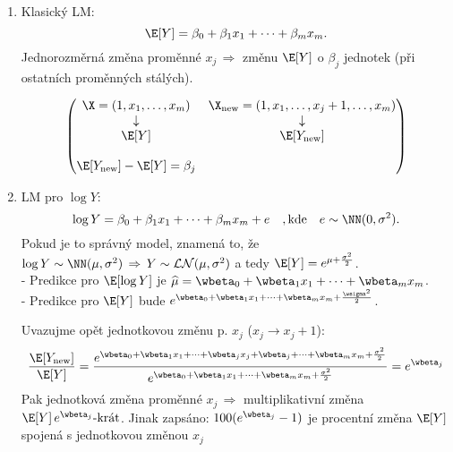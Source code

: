 \begin{enumerate}
\item Klasický LM: 
$$
 \E [ Y ] = \beta_0 + \beta_1 x_1 + \dots + \beta_m x_m.
$$
Jednorozměrná změna proměnné $ x_j \, \Rightarrow $ změnu $ \E [ Y ] $ o $ \beta_j $ jednotek (při ostatních proměnných stálých).

$$
\left( \begin{matrix}
\X = (1,x_1,\dots,x_m) & \X_{\text{new}} = (1,x_1,\dots,x_j+1,\dots,x_m) \\
\downarrow &  \downarrow \\
\E [ Y ] & \E [ Y_{\text{new}} ] \\
 & \\
 \E [ Y_{\text{new}} ] - \E [ Y ]  = \beta_j &
\end{matrix} \right)
$$
\item LM pro $\log Y$:
$$
 \log Y = \beta_0 + \beta_1 x_1 + \dots + \beta_m x_m + e \quad, \text{kde} \quad e \sim \NN(0,\sigma^2).
$$
Pokud je to správný model, znamená to, že $ \log Y \sim \NN(\mu,\sigma^2) \, \Rightarrow \, Y \sim \mathcal{LN}(\mu,\sigma^2) $ a tedy $ \E[Y] = e^{\mu + \frac{\sigma^2}{2}} $. \\
- Predikce pro $ \E [\log Y] $ je $ \widehat{\mu} = \wbeta_0 + \wbeta_1 x_1 + \dots + \wbeta_m x_m $. \\
- Predikce pro $ \E [Y] $ bude $ e^{\wbeta_0 + \wbeta_1 x_1 + \dots + \wbeta_m x_m + \frac{\wsigma^2}{2}} $.

Uvazujme opět jednotkovou změnu p. $ x_j $ ($ x_j \rightarrow x_j + 1 $):
$$
\dfrac{ \E [ Y_{\text{new}} ]}{\E [ Y ]} = \dfrac{e^{\wbeta_0 + \wbeta_1 x_1 + \dots + \wbeta_j x_j + \wbeta_j + \dots + \wbeta_m x_m + \frac{\sigma^2}{2}}}{e^{\wbeta_0 + \wbeta_1 x_1 + \dots + \wbeta_m x_m + \frac{\sigma^2}{2}}} = e^{\wbeta_j}
$$
Pak jednotková změna proměnné $ x_j \, \Rightarrow  $ multiplikativní změna $ \E [ Y ] \, e^{\wbeta_j}\text{-krát} $. Jinak zapsáno: $ 100(e^{\wbeta_j}-1) $ je procentní změna $ \E [ Y ]  $ spojená s jednotkovou změnou $ x_j $
\end{enumerate}